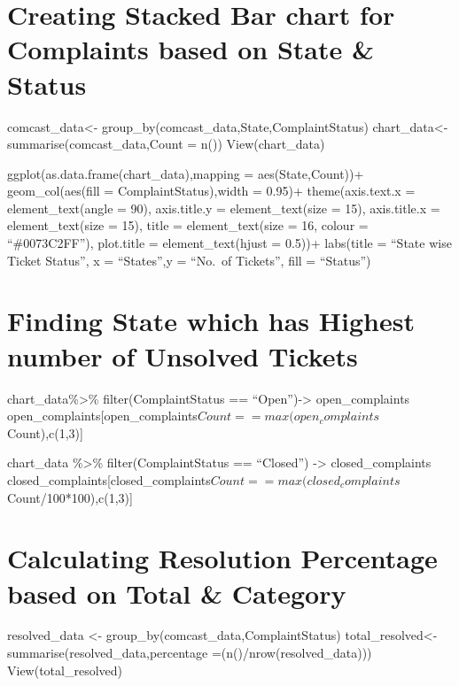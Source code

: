 \documentclass[
]{article}
\begin{document}
\hypertarget{creating-stacked-bar-chart-for-complaints-based-on-state-status}{%
\section{Creating Stacked Bar chart for Complaints based on State \&
Status}\label{creating-stacked-bar-chart-for-complaints-based-on-state-status}}

comcast\_data\textless- group\_by(comcast\_data,State,ComplaintStatus)
chart\_data\textless- summarise(comcast\_data,Count = n())
View(chart\_data)

ggplot(as.data.frame(chart\_data),mapping = aes(State,Count))+
geom\_col(aes(fill = ComplaintStatus),width = 0.95)+ theme(axis.text.x =
element\_text(angle = 90), axis.title.y = element\_text(size = 15),
axis.title.x = element\_text(size = 15), title = element\_text(size =
16, colour = ``\#0073C2FF''), plot.title = element\_text(hjust = 0.5))+
labs(title = ``State wise Ticket Status'', x = ``States'',y = ``No.~of
Tickets'', fill = ``Status'')

\hypertarget{finding-state-which-has-highest-number-of-unsolved-tickets}{%
\section{Finding State which has Highest number of Unsolved
Tickets}\label{finding-state-which-has-highest-number-of-unsolved-tickets}}

chart\_data\%\textgreater\% filter(ComplaintStatus ==
``Open'')-\textgreater{} open\_complaints
open\_complaints{[}open\_complaints\(Count == max(open_complaints\)Count),c(1,3){]}

chart\_data \%\textgreater\% filter(ComplaintStatus == ``Closed'')
-\textgreater{} closed\_complaints
closed\_complaints{[}closed\_complaints\(Count == max(closed_complaints\)Count/100*100),c(1,3){]}

\hypertarget{calculating-resolution-percentage-based-on-total-category}{%
\section{Calculating Resolution Percentage based on Total \&
Category}\label{calculating-resolution-percentage-based-on-total-category}}

resolved\_data \textless- group\_by(comcast\_data,ComplaintStatus)
total\_resolved\textless- summarise(resolved\_data,percentage
=(n()/nrow(resolved\_data))) View(total\_resolved)
\end{document}
